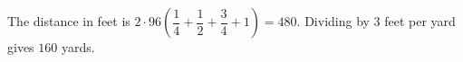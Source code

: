 The distance in feet is $2\cdot96(\dfrac{1}{4}+\dfrac{1}{2}+\dfrac{3}{4}+1)=480$. Dividing by $3$ feet per yard gives $\boxed{160}$ yards.
